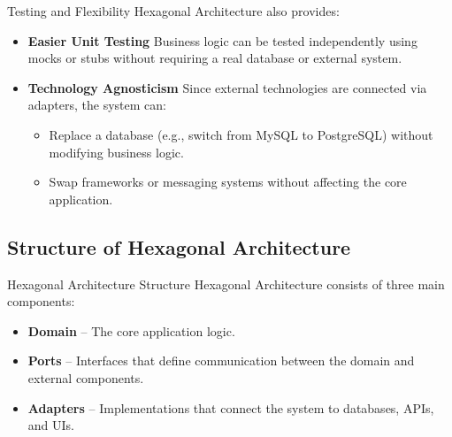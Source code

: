 \documentclass[aspectratio=169, table]{beamer}
\begin{document}
\begin{frame}[fragile]{Testing and Flexibility}
	\vspace{20pt}
	Hexagonal Architecture also provides:
	\begin{itemize}
		\item \textbf{Easier Unit Testing}  
		Business logic can be tested independently using mocks or stubs without requiring a real database or external system.
		
		\item \textbf{Technology Agnosticism}  
		Since external technologies are connected via adapters, the system can:
		\begin{itemize}
			\item Replace a database (e.g., switch from MySQL to PostgreSQL) without modifying business logic.
			\item Swap frameworks or messaging systems without affecting the core application.
		\end{itemize}
	\end{itemize}
\end{frame}

\subsection{Structure of Hexagonal Architecture}

\begin{frame}[fragile]{Hexagonal Architecture Structure}
	\vspace{20pt}
	Hexagonal Architecture consists of three main components:
	\begin{itemize}
		\item \textbf{Domain} – The core application logic.
		\item \textbf{Ports} – Interfaces that define communication between the domain and external components.
		\item \textbf{Adapters} – Implementations that connect the system to databases, APIs, and UIs.
	\end{itemize}
\end{frame}
\end{document}
